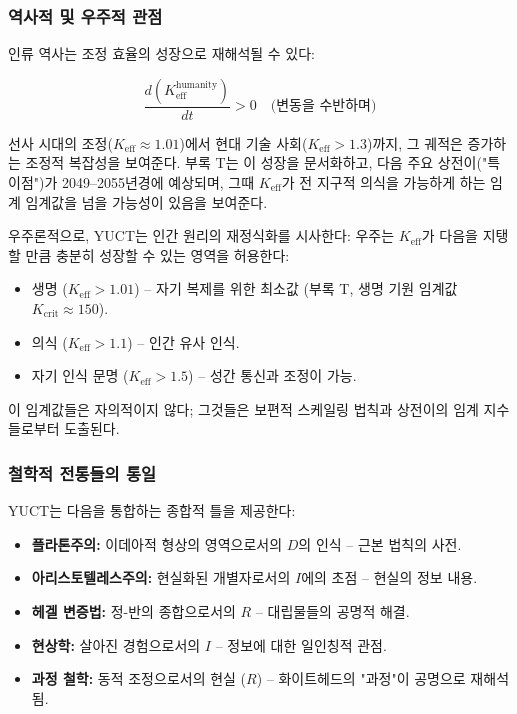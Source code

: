 \documentclass[12pt,a4paper]{article}
\newcommand{\eff}{\mathrm{eff}}
\newcommand{\Ke}{K_{\eff}}
\newcommand{\Kcrit}{K_{\mathrm{crit}}}
\begin{document}
	\subsubsection{역사적 및 우주적 관점}
	
	인류 역사는 조정 효율의 성장으로 재해석될 수 있다:
	
	\[
	\frac{d(\Ke^{\text{humanity}})}{dt} > 0 \quad \text{(변동을 수반하며)}
	\]
	
	선사 시대의 조정(\(\Ke \approx 1.01\))에서 현대 기술 사회(\(\Ke > 1.3\))까지, 그 궤적은 증가하는 조정적 복잡성을 보여준다. 부록 T는 이 성장을 문서화하고, 다음 주요 상전이("특이점")가 2049--2055년경에 예상되며, 그때 \(\Ke\)가 전 지구적 의식을 가능하게 하는 임계 임계값을 넘을 가능성이 있음을 보여준다.
	
	우주론적으로, YUCT는 인간 원리의 재정식화를 시사한다: 우주는 \(\Ke\)가 다음을 지탱할 만큼 충분히 성장할 수 있는 영역을 허용한다:
	\begin{itemize}
		\item 생명 (\(\Ke > 1.01\)) – 자기 복제를 위한 최소값 (부록 T, 생명 기원 임계값 \(\Kcrit \approx 150\)).
		\item 의식 (\(\Ke > 1.1\)) – 인간 유사 인식.
		\item 자기 인식 문명 (\(\Ke > 1.5\)) – 성간 통신과 조정이 가능.
	\end{itemize}
	
	이 임계값들은 자의적이지 않다; 그것들은 보편적 스케일링 법칙과 상전이의 임계 지수들로부터 도출된다.
	
	\subsubsection{철학적 전통들의 통일}
	
	YUCT는 다음을 통합하는 종합적 틀을 제공한다:
	\begin{itemize}
		\item \textbf{플라톤주의:} 이데아적 형상의 영역으로서의 \(D\)의 인식 – 근본 법칙의 사전.
		\item \textbf{아리스토텔레스주의:} 현실화된 개별자로서의 \(I\)에의 초점 – 현실의 정보 내용.
		\item \textbf{헤겔 변증법:} 정-반의 종합으로서의 \(R\) – 대립물들의 공명적 해결.
		\item \textbf{현상학:} 살아진 경험으로서의 \(I\) – 정보에 대한 일인칭적 관점.
		\item \textbf{과정 철학:} 동적 조정으로서의 현실 (\(R\)) – 화이트헤드의 "과정"이 공명으로 재해석됨.
	\end{itemize}
	
\end{document}
